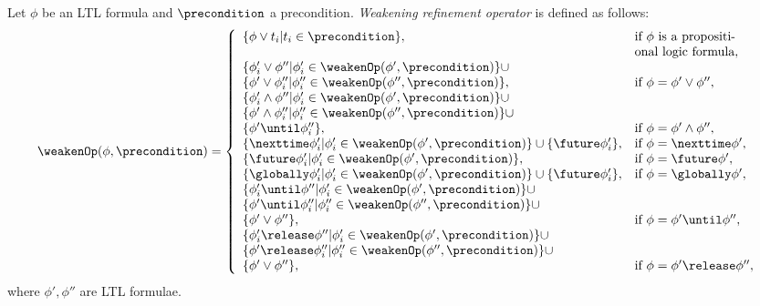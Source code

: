 \begin{definition}\label{def:weak-op}
    Let $\phi$ be an LTL formula and $\precondition$ a precondition. 
    {\em Weakening refinement operator} is defined as follows:
    \begin{equation}
        \nonumber
        \weakenOp(\phi,\precondition) =
        \left\{
            \begin{array}{ll}
            \{ \phi \lor t_i | t_i \in \precondition \}, & \text{if } \phi \text{ is a propositi-}\\ 
            &\text{onal logic formula},\\ 
            \{ \phi_i' \lor \phi'' | \phi_i' \in \weakenOp(\phi',\precondition) \} \cup\\
            \{ \phi' \lor \phi_i'' | \phi_i'' \in \weakenOp(\phi'',\precondition) \}, & \text{if } \phi = \phi' \lor \phi'',\\
            \{ \phi_i' \land \phi'' | \phi_i' \in \weakenOp(\phi',\precondition) \} \cup\\
            \{ \phi' \land \phi_i'' | \phi_i'' \in \weakenOp(\phi'',\precondition) \} \cup\\
            \{ \phi' \until \phi_i'' \}, & \text{if } \phi = \phi' \land \phi'', \\
            \{ \nexttime \phi_i' | \phi_i' \in \weakenOp(\phi',\precondition) \} \cup \{ \future \phi_i' \}, & \text{if } \phi = \nexttime \phi', \\
            \{ \future \phi_i' | \phi_i' \in \weakenOp(\phi',\precondition) \}, & \text{if } \phi = \future \phi', \\
            \{ \globally \phi_i' | \phi_i' \in \weakenOp(\phi',\precondition) \} \cup \{ \future \phi_i' \}, & \text{if } \phi = \globally \phi', \\
            \{ \phi_i' \until \phi'' | \phi_i' \in \weakenOp(\phi',\precondition) \} \cup\\
            \{ \phi' \until \phi_i'' | \phi_i'' \in \weakenOp(\phi'',\precondition) \} \cup\\
            \{ \phi' \lor \phi'' \}, & \text{if } \phi = \phi' \until \phi'', \\
            \{ \phi_i' \release \phi'' | \phi_i' \in \weakenOp(\phi',\precondition) \} \cup\\
            \{ \phi' \release \phi_i'' | \phi_i'' \in \weakenOp(\phi'',\precondition) \} \cup\\
            \{ \phi' \lor \phi'' \}, & \text{if } \phi = \phi' \release \phi'', \\
            \end{array}
        \right.
    \end{equation}
    where $\phi',\phi''$ are LTL formulae.
\end{definition}

